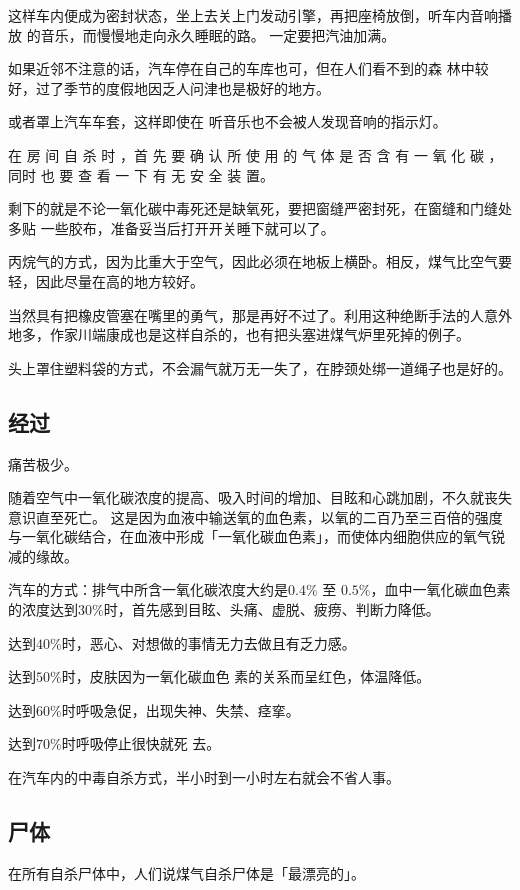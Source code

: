 \documentclass[UTF8]{ctexart}
\begin{document}
这样车内便成为密封状态，坐上去关上门发动引擎，再把座椅放倒，听车内音响播放 的音乐，而慢慢地走向永久睡眠的路。 一定要把汽油加满。

如果近邻不注意的话，汽车停在自己的车库也可，但在人们看不到的森 林中较好，过了季节的度假地因乏人问津也是极好的地方。

或者罩上汽车车套，这样即使在 听音乐也不会被人发现音响的指示灯。

在 房 间 自 杀 时 ，首 先 要 确 认 所 使 用 的 气 体 是 否 含 有 一 氧 化 碳 ，同时 也 要 查 看 一 下 有 无 安 全 装 置。

剩下的就是不论一氧化碳中毒死还是缺氧死，要把窗缝严密封死，在窗缝和门缝处多贴 一些胶布，准备妥当后打开开关睡下就可以了。

丙烷气的方式，因为比重大于空气，因此必须在地板上横卧。相反，煤气比空气要轻，因此尽量在高的地方较好。

当然具有把橡皮管塞在嘴里的勇气，那是再好不过了。利用这种绝断手法的人意外地多，作家川端康成也是这样自杀的，也有把头塞进煤气炉里死掉的例子。

头上罩住塑料袋的方式，不会漏气就万无一失了，在脖颈处绑一道绳子也是好的。

\subsection{经过}

痛苦极少。

随着空气中一氧化碳浓度的提高、吸入时间的增加、目眩和心跳加剧，不久就丧失意识直至死亡。
这是因为血液中输送氧的血色素，以氧的二百乃至三百倍的强度与一氧化碳结合，在血液中形成「一氧化碳血色素」，而使体内细胞供应的氧气锐减的缘故。

汽车的方式：排气中所含一氧化碳浓度大约是$0.4\%$ 至 $0.5\%$，血中一氧化碳血色素的浓度达到$30\%$时，首先感到目眩、头痛、虚脱、疲痨、判断力降低。

达到$40\%$时，恶心、对想做的事情无力去做且有乏力感。

达到$50\%$时，皮肤因为一氧化碳血色 素的关系而呈红色，体温降低。 

达到$60\%$时呼吸急促，出现失神、失禁、痉挛。

达到$70\%$时呼吸停止很快就死 去。 

在汽车内的中毒自杀方式，半小时到一小时左右就会不省人事。

\subsection{尸体}

在所有自杀尸体中，人们说煤气自杀尸体是「最漂亮的」。
\end{document}
